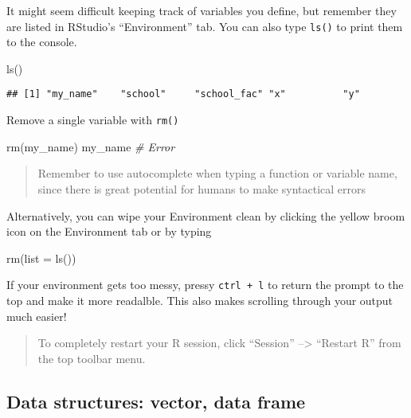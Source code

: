 \documentclass[
]{article}
\newenvironment{Shaded}{\begin{snugshade}}{\end{snugshade}}
\newcommand{\AttributeTok}[1]{\textcolor[rgb]{0.77,0.63,0.00}{#1}}
\newcommand{\CommentTok}[1]{\textcolor[rgb]{0.56,0.35,0.01}{\textit{#1}}}
\newcommand{\FunctionTok}[1]{\textcolor[rgb]{0.00,0.00,0.00}{#1}}
\newcommand{\NormalTok}[1]{#1}
\begin{document}
It might seem difficult keeping track of variables you define, but
remember they are listed in RStudio's ``Environment'' tab. You can also
type \texttt{ls()} to print them to the console.

\begin{Shaded}
\begin{Highlighting}[]
\FunctionTok{ls}\NormalTok{()}
\end{Highlighting}
\end{Shaded}

\begin{verbatim}
## [1] "my_name"    "school"     "school_fac" "x"          "y"
\end{verbatim}

Remove a single variable with \texttt{rm()}

\begin{Shaded}
\begin{Highlighting}[]
\FunctionTok{rm}\NormalTok{(my\_name)}
\NormalTok{my\_name }\CommentTok{\# Error}
\end{Highlighting}
\end{Shaded}

\begin{quote}
Remember to use autocomplete when typing a function or variable name,
since there is great potential for humans to make syntactical errors
\end{quote}

Alternatively, you can wipe your Environment clean by clicking the
yellow broom icon on the Environment tab or by typing

\begin{Shaded}
\begin{Highlighting}[]
\FunctionTok{rm}\NormalTok{(}\AttributeTok{list =} \FunctionTok{ls}\NormalTok{())}
\end{Highlighting}
\end{Shaded}

If your environment gets too messy, pressy \texttt{ctrl\ +\ l} to return
the prompt to the top and make it more readalble. This also makes
scrolling through your output much easier!

\begin{quote}
To completely restart your R session, click ``Session'' --\textgreater{}
``Restart R'' from the top toolbar menu.
\end{quote}

\hypertarget{data-structures-vector-data-frame}{%
\subsection{Data structures: vector, data
frame}\label{data-structures-vector-data-frame}}
\end{document}

